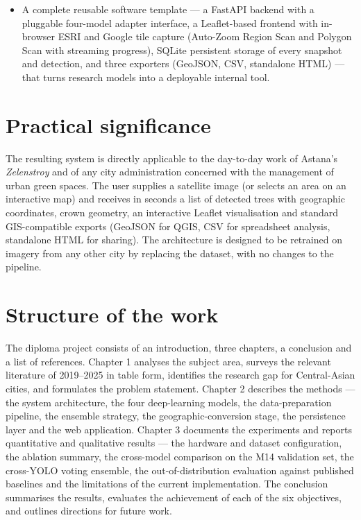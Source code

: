 \begin{itemize}
\item
  A complete reusable software template --- a FastAPI backend with a pluggable four-model adapter interface, a Leaflet-based frontend with in-browser ESRI and Google tile capture (Auto-Zoom Region Scan and Polygon Scan with streaming progress), SQLite persistent storage of every snapshot and detection, and three exporters (GeoJSON, CSV, standalone HTML) --- that turns research models into a deployable internal tool.
\end{itemize}

\section{Practical significance}\label{practical-significance}

The resulting system is directly applicable to the day-to-day work of Astana's \emph{Zelenstroy} and of any city administration concerned with the management of urban green spaces. The user supplies a satellite image (or selects an area on an interactive map) and receives in seconds a list of detected trees with geographic coordinates, crown geometry, an interactive Leaflet visualisation and standard GIS-compatible exports (GeoJSON for QGIS, CSV for spreadsheet analysis, standalone HTML for sharing). The architecture is designed to be retrained on imagery from any other city by replacing the dataset, with no changes to the pipeline.

\section{Structure of the work}\label{structure-of-the-work}

The diploma project consists of an introduction, three chapters, a conclusion and a list of references. Chapter 1 analyses the subject area, surveys the relevant literature of 2019--2025 in table form, identifies the research gap for Central-Asian cities, and formulates the problem statement. Chapter 2 describes the methods --- the system architecture, the four deep-learning models, the data-preparation pipeline, the ensemble strategy, the geographic-conversion stage, the persistence layer and the web application. Chapter 3 documents the experiments and reports quantitative and qualitative results --- the hardware and dataset configuration, the ablation summary, the cross-model comparison on the M14 validation set, the cross-YOLO voting ensemble, the out-of-distribution evaluation against published baselines and the limitations of the current implementation. The conclusion summarises the results, evaluates the achievement of each of the six objectives, and outlines directions for future work.

\newpage

